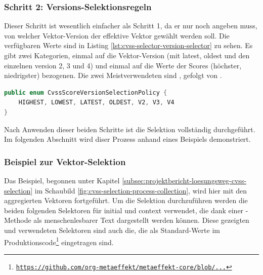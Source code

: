 \subsubsection{Schritt 2: Versions-Selektionsregeln} \label{subsubsec:projektbericht-loesungsweg-cvss-selection-rules-2}

Dieser Schritt ist wesentlich einfacher als Schritt 1, da er nur noch angeben muss, von welcher Vektor-Version der effektive Vektor gewählt werden soll.
Die verfügbaren Werte sind in Listing \ref{lst:cvss-selector-version-selector} zu sehen.
Es gibt zwei Kategorien, einmal auf die Vektor-Version (mit latest, oldest und den einzelnen version 2, 3 und 4) und einmal auf die Werte der Scores (höchster, niedrigster) bezogenen.
Die zwei Meistverwendeten sind , gefolgt von .

\begin{lstlisting}[language=Java, label={lst:cvss-selector-version-selector}, caption={Gültige Werte für die Versions-Selektion}]
public enum CvssScoreVersionSelectionPolicy {
    HIGHEST, LOWEST, LATEST, OLDEST, V2, V3, V4
}
\end{lstlisting}

Nach Anwenden dieser beiden Schritte ist die Selektion vollständig durchgeführt.
Im folgenden Abschnitt wird diser Prozess anhand eines Beispiels demonstriert.

\subsubsection{Beispiel zur Vektor-Selektion} \label{subsubsec:projektbericht-loesungsweg-cvss-selection-example}

Das Beispiel, begonnen unter Kapitel \ref{subsec:projektbericht-loesungsweg-cvss-selection} im Schaubild \ref{fig:cvss-selection-process-collection}, wird hier mit den aggregierten Vektoren fortgeführt.
Um die Selektion durchzuführen werden die beiden folgenden Selektoren für initial und context verwendet, die dank einer -Methode als menschenlesbarer Text dargestellt werden können.
Diese gezeigten und verwendeten Selektoren sind auch die, die als Standard-Werte im Produktionscode\footnote{\href{https://github.com/org-metaeffekt/metaeffekt-core/blob/1f0a1f6ac5e8343e10ea182794faf534bdfb3310/libraries/ae-inventory-processor/src/main/java/org/metaeffekt/core/inventory/processor/report/configuration/CentralSecurityPolicyConfiguration.java\#L568}{\texttt{https://github.com/org-metaeffekt/metaeffekt-core/blob/...}}} eingetragen sind.


